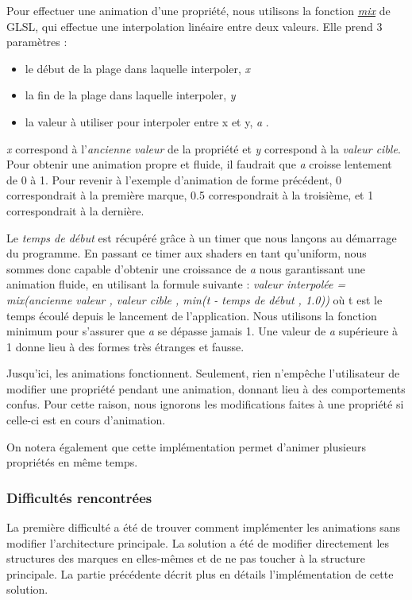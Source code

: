 \documentclass[12pt]{article}
\begin{document}
Pour effectuer une animation d'une propriété, nous utilisons la fonction
\textit{\href{https://www.khronos.org/registry/OpenGL-Refpages/gl4/html/mix.xhtml}{mix}} de GLSL, qui effectue une
interpolation linéaire entre deux valeurs.
Elle prend 3 paramètres :
\begin{itemize}
\item le début de la plage dans laquelle interpoler, \og \textit{x} \fg
\item la fin de la plage dans laquelle interpoler, \og \textit{y} \fg
\item la valeur à utiliser pour interpoler entre x et y, \og \textit{a} \fg.
\end{itemize}

\textit{x} correspond à l'\textit{ancienne valeur} de la propriété et \textit{y} correspond à la
\textit{valeur cible}.
Pour obtenir une animation propre et fluide, il faudrait que \textit{a} croisse lentement de 0 à 1.
Pour revenir à l'exemple d'animation de forme précédent, 0 correspondrait à la première marque, 0.5
correspondrait à la troisième, et 1 correspondrait à la dernière.

Le \textit{temps de début} est récupéré grâce à un timer que nous lançons au démarrage du programme.
En passant ce timer aux shaders en tant qu'\gls{uniform}, nous sommes donc capable d'obtenir une croissance
de \textit{a} nous garantissant une animation fluide, en utilisant la formule suivante :
\textit{valeur interpolée = mix(ancienne valeur , valeur cible , min(t - temps de début , 1.0))} où t est
le temps  écoulé depuis le lancement de l'application.
Nous utilisons la fonction minimum pour s'assurer que \textit{a} se dépasse jamais 1. Une valeur de
\textit{a} supérieure à 1 donne lieu à des formes très étranges et fausse.

Jusqu'ici, les animations fonctionnent. Seulement, rien n'empêche l'utilisateur de modifier une propriété pendant une animation, donnant lieu à des comportements confus.
Pour cette raison, nous ignorons les modifications faites à une propriété si celle-ci est en cours
d'animation.

On notera également que cette implémentation permet d'animer plusieurs propriétés en même temps.

\subsubsection{Difficultés rencontrées}

La première difficulté a été de trouver comment implémenter les animations sans modifier l'architecture
principale. La solution a été de modifier directement les structures des
marques en elles-mêmes et de ne pas toucher à la structure principale. La partie précédente décrit plus en
détails l'implémentation de cette solution.
\end{document}
